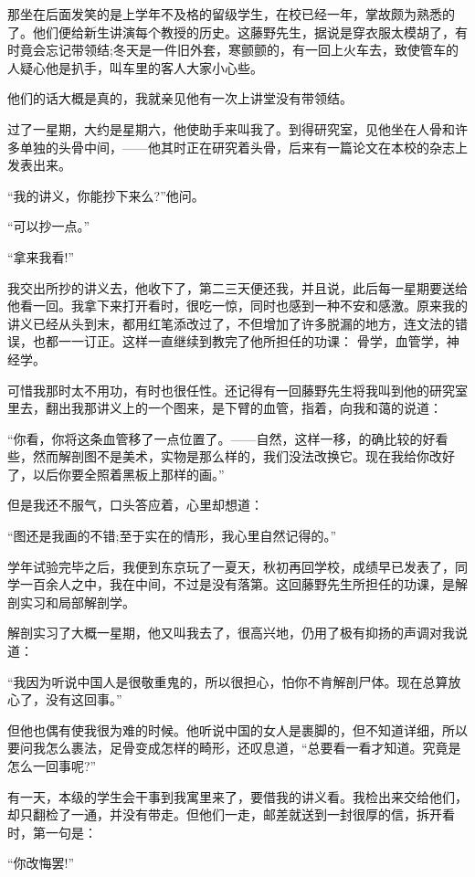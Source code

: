     那坐在后面发笑的是上学年不及格的留级学生，在校已经一年，掌故颇为熟悉的了。他们便给新生讲演每个教授的历史。这藤野先生，据说是穿衣服太模胡了，有时竟会忘记带领结;冬天是一件旧外套，寒颤颤的，有一回上火车去，致使管车的人疑心他是扒手，叫车里的客人大家小心些。

    他们的话大概是真的，我就亲见他有一次上讲堂没有带领结。

    过了一星期，大约是星期六，他使助手来叫我了。到得研究室，见他坐在人骨和许多单独的头骨中间，——他其时正在研究着头骨，后来有一篇论文在本校的杂志上发表出来。

    “我的讲义，你能抄下来么?”他问。

    “可以抄一点。”

    “拿来我看!”

    我交出所抄的讲义去，他收下了，第二三天便还我，并且说，此后每一星期要送给他看一回。我拿下来打开看时，很吃一惊，同时也感到一种不安和感激。原来我的讲义已经从头到末，都用红笔添改过了，不但增加了许多脱漏的地方，连文法的错误，也都一一订正。这样一直继续到教完了他所担任的功课： 骨学，血管学，神经学。

    可惜我那时太不用功，有时也很任性。还记得有一回藤野先生将我叫到他的研究室里去，翻出我那讲义上的一个图来，是下臂的血管，指着，向我和蔼的说道：

    “你看，你将这条血管移了一点位置了。——自然，这样一移，的确比较的好看些，然而解剖图不是美术，实物是那么样的，我们没法改换它。现在我给你改好了，以后你要全照着黑板上那样的画。”

    但是我还不服气，口头答应着，心里却想道：

    “图还是我画的不错;至于实在的情形，我心里自然记得的。”

    学年试验完毕之后，我便到东京玩了一夏天，秋初再回学校，成绩早已发表了，同学一百余人之中，我在中间，不过是没有落第。这回藤野先生所担任的功课，是解剖实习和局部解剖学。

    解剖实习了大概一星期，他又叫我去了，很高兴地，仍用了极有抑扬的声调对我说道：

    “我因为听说中国人是很敬重鬼的，所以很担心，怕你不肯解剖尸体。现在总算放心了，没有这回事。”

    但他也偶有使我很为难的时候。他听说中国的女人是裹脚的，但不知道详细，所以要问我怎么裹法，足骨变成怎样的畸形，还叹息道，“总要看一看才知道。究竟是怎么一回事呢?”

    有一天，本级的学生会干事到我寓里来了，要借我的讲义看。我检出来交给他们，却只翻检了一通，并没有带走。但他们一走，邮差就送到一封很厚的信，拆开看时，第一句是：

    “你改悔罢!”

